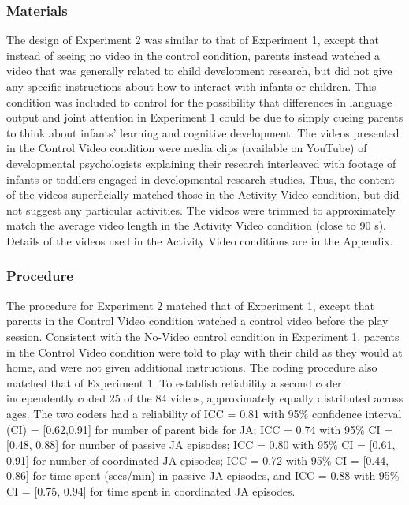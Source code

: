 \documentclass[
  english,
  man]{apa6}
\begin{document}
\hypertarget{materials-1}{%
\subsubsection{Materials}\label{materials-1}}

The design of Experiment 2 was similar to that of Experiment 1, except that instead of seeing no video in the control condition, parents instead watched a video that was generally related to child development research, but did not give any specific instructions about how to interact with infants or children.
This condition was included to control for the possibility that differences in language output and joint attention in Experiment 1 could be due to simply cueing parents to think about infants' learning and cognitive development.
The videos presented in the Control Video condition were media clips (available on YouTube) of developmental psychologists explaining their research interleaved with footage of infants or toddlers engaged in developmental research studies.
Thus, the content of the videos superficially matched those in the Activity Video condition, but did not suggest any particular activities.
The videos were trimmed to approximately match the average video length in the Activity Video condition (close to 90 s).
Details of the videos used in the Activity Video conditions are in the Appendix.

\hypertarget{procedure-1}{%
\subsubsection{Procedure}\label{procedure-1}}

The procedure for Experiment 2 matched that of Experiment 1, except that parents in the Control Video condition watched a control video before the play session.
Consistent with the No-Video control condition in Experiment 1, parents in the Control Video condition were told to play with their child as they would at home, and were not given additional instructions.
The coding procedure also matched that of Experiment 1.
To establish reliability a second coder independently coded 25 of the 84 videos, approximately equally distributed across ages.
The two coders had a reliability of ICC = 0.81 with 95\% confidence interval (CI) = {[}0.62,0.91{]} for number of parent bids for JA; ICC = 0.74 with 95\% CI = {[}0.48, 0.88{]} for number of passive JA episodes; ICC = 0.80 with 95\% CI = {[}0.61, 0.91{]} for number of coordinated JA episodes; ICC = 0.72 with 95\% CI = {[}0.44, 0.86{]} for time spent (secs/min) in passive JA episodes, and ICC = 0.88 with 95\% CI = {[}0.75, 0.94{]} for time spent in coordinated JA episodes.
\end{document}
